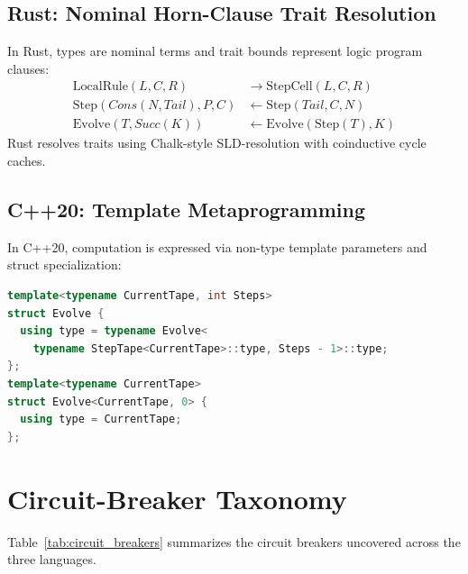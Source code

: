 \documentclass[10pt,journal,compsoc]{IEEEtran}
\begin{document}
\subsection{Rust: Nominal Horn-Clause Trait Resolution}
In Rust, types are nominal terms and trait bounds represent logic program clauses:
\begin{align}
\text{LocalRule}(L, C, R) &\to \text{StepCell}(L, C, R) \\
\text{Step}(Cons(N, Tail), P, C) &\leftarrow \text{Step}(Tail, C, N) \\
\text{Evolve}(T, Succ(K)) &\leftarrow \text{Evolve}(\text{Step}(T), K)
\end{align}
Rust resolves traits using Chalk-style SLD-resolution with coinductive cycle caches.

\subsection{C++20: Template Metaprogramming}
In C++20, computation is expressed via non-type template parameters and struct specialization:
\begin{lstlisting}[language=C++]
template<typename CurrentTape, int Steps>
struct Evolve {
  using type = typename Evolve<
    typename StepTape<CurrentTape>::type, Steps - 1>::type;
};
template<typename CurrentTape>
struct Evolve<CurrentTape, 0> {
  using type = CurrentTape;
};
\end{lstlisting}

\section{Circuit-Breaker Taxonomy}

Table~\ref{tab:circuit_breakers} summarizes the circuit breakers uncovered across the three languages.
\end{document}
